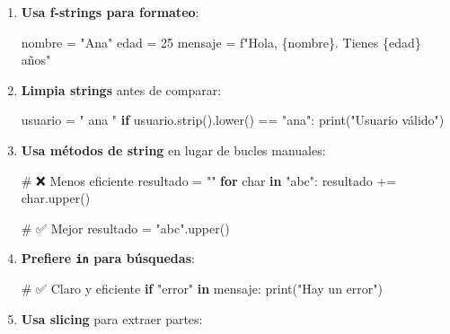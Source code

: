 \documentclass[
  doc,
  floatsintext,
  longtable,
  a4paper,
  nolmodern,
  notxfonts,
  notimes,
  12pt,
  colorlinks=true,linkcolor=blue,citecolor=blue,urlcolor=blue]{apa7}
\newenvironment{Shaded}{\begin{snugshade}}{\end{snugshade}}
\newcommand{\BuiltInTok}[1]{\textcolor[rgb]{0.00,0.23,0.31}{#1}}
\newcommand{\CommentTok}[1]{\textcolor[rgb]{0.37,0.37,0.37}{#1}}
\newcommand{\ControlFlowTok}[1]{\textcolor[rgb]{0.00,0.23,0.31}{\textbf{#1}}}
\newcommand{\DecValTok}[1]{\textcolor[rgb]{0.68,0.00,0.00}{#1}}
\newcommand{\KeywordTok}[1]{\textcolor[rgb]{0.00,0.23,0.31}{\textbf{#1}}}
\newcommand{\NormalTok}[1]{\textcolor[rgb]{0.00,0.23,0.31}{#1}}
\newcommand{\OperatorTok}[1]{\textcolor[rgb]{0.37,0.37,0.37}{#1}}
\newcommand{\SpecialCharTok}[1]{\textcolor[rgb]{0.37,0.37,0.37}{#1}}
\newcommand{\SpecialStringTok}[1]{\textcolor[rgb]{0.13,0.47,0.30}{#1}}
\newcommand{\StringTok}[1]{\textcolor[rgb]{0.13,0.47,0.30}{#1}}
\begin{document}
\begin{enumerate}
\def\labelenumi{\arabic{enumi}.}
\item
  \textbf{Usa f-strings para formateo}:

\begin{Shaded}
\begin{Highlighting}[]
\NormalTok{nombre }\OperatorTok{=} \StringTok{"Ana"}
\NormalTok{edad }\OperatorTok{=} \DecValTok{25}
\NormalTok{mensaje }\OperatorTok{=} \SpecialStringTok{f"Hola, }\SpecialCharTok{\{}\NormalTok{nombre}\SpecialCharTok{\}}\SpecialStringTok{. Tienes }\SpecialCharTok{\{}\NormalTok{edad}\SpecialCharTok{\}}\SpecialStringTok{ años"}
\end{Highlighting}
\end{Shaded}
\item
  \textbf{Limpia strings} antes de comparar:

\begin{Shaded}
\begin{Highlighting}[]
\NormalTok{usuario }\OperatorTok{=} \StringTok{"  ana  "}
\ControlFlowTok{if}\NormalTok{ usuario.strip().lower() }\OperatorTok{==} \StringTok{"ana"}\NormalTok{:}
    \BuiltInTok{print}\NormalTok{(}\StringTok{"Usuario válido"}\NormalTok{)}
\end{Highlighting}
\end{Shaded}
\item
  \textbf{Usa métodos de string} en lugar de bucles manuales:

\begin{Shaded}
\begin{Highlighting}[]
\CommentTok{\# ❌ Menos eficiente}
\NormalTok{resultado }\OperatorTok{=} \StringTok{""}
\ControlFlowTok{for}\NormalTok{ char }\KeywordTok{in} \StringTok{"abc"}\NormalTok{:}
\NormalTok{    resultado }\OperatorTok{+=}\NormalTok{ char.upper()}

\CommentTok{\# ✅ Mejor}
\NormalTok{resultado }\OperatorTok{=} \StringTok{"abc"}\NormalTok{.upper()}
\end{Highlighting}
\end{Shaded}
\item
  \textbf{Prefiere \texttt{in} para búsquedas}:

\begin{Shaded}
\begin{Highlighting}[]
\CommentTok{\# ✅ Claro y eficiente}
\ControlFlowTok{if} \StringTok{"error"} \KeywordTok{in}\NormalTok{ mensaje:}
    \BuiltInTok{print}\NormalTok{(}\StringTok{"Hay un error"}\NormalTok{)}
\end{Highlighting}
\end{Shaded}
\item
  \textbf{Usa slicing} para extraer partes:


\end{enumerate}
\end{document}
